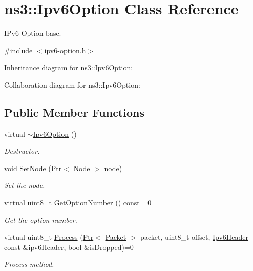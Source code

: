 \hypertarget{classns3_1_1Ipv6Option}{}\section{ns3\+:\+:Ipv6\+Option Class Reference}
\label{classns3_1_1Ipv6Option}


I\+Pv6 Option base.  




{\ttfamily \#include $<$ipv6-\/option.\+h$>$}



Inheritance diagram for ns3\+:\+:Ipv6\+Option\+:


Collaboration diagram for ns3\+:\+:Ipv6\+Option\+:
\subsection*{Public Member Functions}
\begin{DoxyCompactItemize}
\item 
virtual \hyperlink{classns3_1_1Ipv6Option_ae1097a669e638e88925648893f23d236}{$\sim$\+Ipv6\+Option} ()
\begin{DoxyCompactList}\small\item\em Destructor. \end{DoxyCompactList}\item 
void \hyperlink{classns3_1_1Ipv6Option_afb1efc042e98497c1d3b16ce2c887f1f}{Set\+Node} (\hyperlink{classns3_1_1Ptr}{Ptr}$<$ \hyperlink{classns3_1_1Node}{Node} $>$ node)
\begin{DoxyCompactList}\small\item\em Set the node. \end{DoxyCompactList}\item 
virtual uint8\+\_\+t \hyperlink{classns3_1_1Ipv6Option_a7b580c299369730eb4b03124f7e56b42}{Get\+Option\+Number} () const =0
\begin{DoxyCompactList}\small\item\em Get the option number. \end{DoxyCompactList}\item 
virtual uint8\+\_\+t \hyperlink{classns3_1_1Ipv6Option_a2eee4158ef539a94a88d7ed38ebecb9f}{Process} (\hyperlink{classns3_1_1Ptr}{Ptr}$<$ \hyperlink{classns3_1_1Packet}{Packet} $>$ packet, uint8\+\_\+t offset, \hyperlink{classns3_1_1Ipv6Header}{Ipv6\+Header} const \&ipv6\+Header, bool \&is\+Dropped)=0
\begin{DoxyCompactList}\small\item\em Process method. \end{DoxyCompactList}\end{DoxyCompactItemize}
